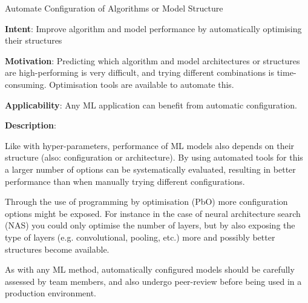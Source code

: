   
  \begin{frame}[plain]{ Automate Configuration of Algorithms or Model Structure
 }

  \textbf{Intent}: Improve algorithm and model performance by automatically optimising their structures 
 

  \textbf{Motivation}: Predicting which algorithm and model architectures or structures are high-performing is very difficult, and trying different combinations is time-consuming. Optimisation tools are available to automate this. 
 

  \textbf{Applicability}: Any ML application can benefit from automatic configuration. 
 

  \textbf{Description}: 

Like with hyper-parameters, performance of ML models also depends on their structure (also: configuration or architecture). By using automated tools for this a larger number of options can be systematically evaluated, resulting in better performance than when manually trying different configurations.


Through the use of programming by optimisation (PbO) more configuration options might be exposed. For instance in the case of neural architecture search (NAS) you could only optimise the number of layers, but by also exposing the type of layers (e.g. convolutional, pooling, etc.) more and possibly better structures become available.


As with any ML method, automatically configured models should be carefully assessed by team members, and also undergo peer-review before being used in a production environment.


 


  \end{frame}

